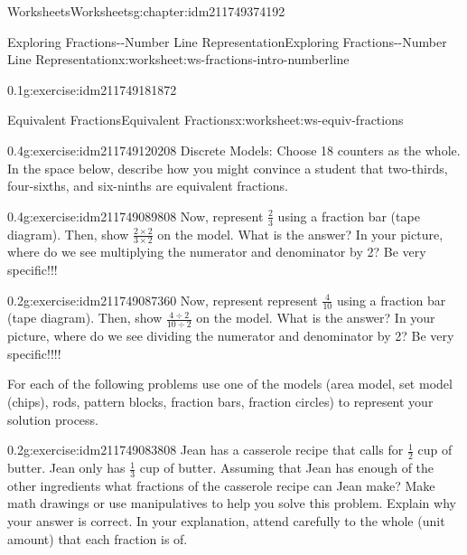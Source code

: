 \documentclass[twoside,11pt,]{book}
\begin{document}
\begin{chapterptx}{Worksheets}{}{Worksheets}{}{}{g:chapter:idm211749374192}
\begin{worksheet-section-numberless}{Exploring Fractions-{}-{}Number Line Representation}{}{Exploring Fractions-{}-{}Number Line Representation}{}{}{x:worksheet:ws-fractions-intro-numberline}
\begin{divisionexercise}{2}{}{0.1}{g:exercise:idm211749181872}
\end{divisionexercise}%
\end{worksheet-section-numberless}
\restoregeometry
%
%
\typeout{************************************************}
\typeout{************************************************}
%
\begin{worksheet-section-numberless}{Equivalent Fractions}{}{Equivalent Fractions}{}{}{x:worksheet:ws-equiv-fractions}
\begin{divisionexercise}{1}{}{0.4}{g:exercise:idm211749120208}%
Discrete Models: Choose 18 counters as the whole. In the space below, describe how you might convince a student that two-thirds, four-sixths, and six-ninths are equivalent fractions.%
\end{divisionexercise}%
\begin{divisionexercise}{2}{}{0.4}{g:exercise:idm211749089808}%
Now, represent \(\frac{2}{3} \) using a fraction bar (tape diagram). Then, show  \(\frac{2 \times 2}{3 \times 2} \) on the model. What is the answer? In your picture, where do we see multiplying the numerator and denominator by 2? Be very specific!!!%
\end{divisionexercise}%
\begin{divisionexercise}{3}{}{0.2}{g:exercise:idm211749087360}%
Now, represent represent \(\frac{4}{10} \) using a fraction bar (tape diagram). Then, show  \(\frac{4 \div 2}{10 \div 2} \) on the model. What is the answer? In your picture, where do we see dividing the numerator and denominator by 2? Be very specific!!!!%
\end{divisionexercise}%
\begin{introduction}{}%
For each of the following problems use one of the models (area model, set model (chips), rods, pattern blocks, fraction bars, fraction circles) to represent your solution process.%
\end{introduction}%
\begin{divisionexercise}{4}{}{0.2}{g:exercise:idm211749083808}%
Jean has a casserole recipe that calls for \(\frac{1}{2} \) cup of butter. Jean only has \(\frac{1}{3} \) cup of butter. Assuming that Jean has enough of the other ingredients what fractions of the casserole recipe can Jean make? Make math drawings or use manipulatives to help you solve this problem. Explain why your answer is correct. In your explanation, attend carefully to the whole (unit amount) that each fraction is of.%
\end{divisionexercise}%

\end{worksheet-section-numberless}
\end{chapterptx}
\end{document}

